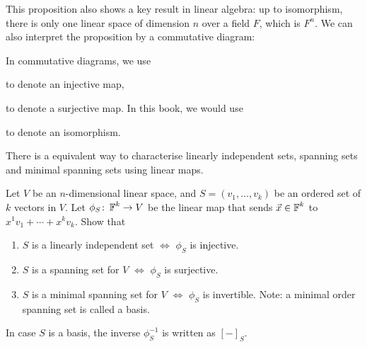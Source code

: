 This proposition also shows a key result in linear algebra: up to isomorphism, there is only one linear space of dimension $n$ over a field $F$, which is $F^n$. We can also interpret the proposition by a commutative diagram:
\begin{center}
\end{center}

\begin{remark}
  In commutative diagrams, we use  to denote an injective map,  to denote a surjective map. In this book, we would use  to denote an isomorphism.
\end{remark}

There is a equivalent way to characterise linearly independent sets, spanning sets and minimal spanning sets using linear maps.
\begin{exercise}\label{ex:characterise_sets_using_linear_maps}
  Let $V$ be an $n$-dimensional linear space, and $S = (v_1, \ldots, v_k)$ be an ordered set of $k$ vectors in $V$. Let $\phi_S \colon \operatorname{\mathbb{F}}^k \to V$ be the linear map that sends $\vec{x} \in \operatorname{\mathbb{F}}^k$ to $x^1 v_1 + \cdots + x^k v_k$. Show that
  \begin{enumerate}
    \item $S$ is a linearly independent set $\iff$ $\phi_S$ is injective.
    \item $S$ is a spanning set for $V$ $\iff$ $\phi_S$ is surjective.
    \item $S$ is a minimal spanning set for $V$ $\iff$ $\phi_S$ is invertible. Note: a minimal order spanning set is called a basis.
  \end{enumerate}
  In case $S$ is a basis, the inverse $\phi_S^{-1}$ is written as ${[-]}_S$.
\end{exercise}

